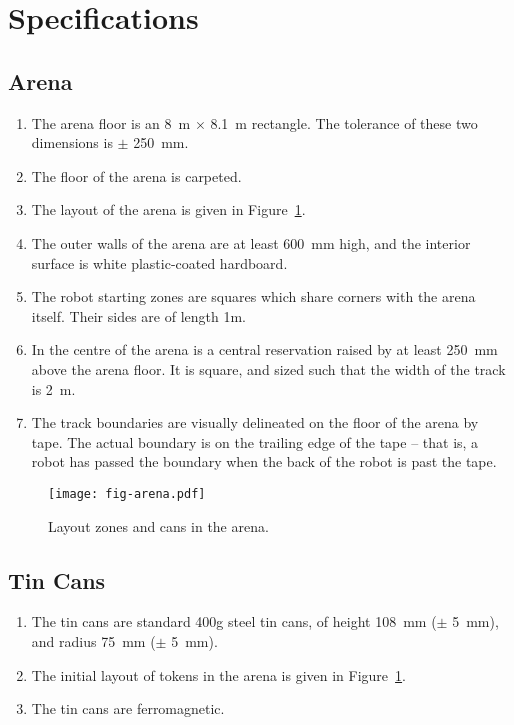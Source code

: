 \section{Specifications}
\label{sec:specs}

\subsection{Arena}
\label{spec:arena}

\begin{enumerate}
  \item The arena floor is an \SI{8}{m} $\times$ \SI{8.1}{m} rectangle. The
        tolerance of these two dimensions is $\pm$ \SI{250}{mm}.
  \item The floor of the arena is carpeted.
  \item The layout of the arena is given in Figure~\ref{fig:arena}.
  \item The outer walls of the arena are at least \SI{600}{mm} high, and the
        interior surface is white plastic-coated hardboard.
  \item The robot starting zones are squares which share corners with the arena
        itself. Their sides are of length \si{1}{m}.
  \item In the centre of the arena is a central reservation raised by
        at least \SI{250}{mm} above the arena floor. It is square, and
        sized such that the width of the track is \SI{2}{m}.
  \item The track boundaries are visually delineated on the floor of the arena
        by tape. The actual boundary is on the trailing edge of the tape --
        that is, a robot has passed the boundary when the back of the robot
        is past the tape.
\end{enumerate}

\begin{figure}
  \texttt{[image: fig-arena.pdf]}
  \caption{Layout zones and cans in the arena.}
  \label{fig:arena}
\end{figure}

\subsection{Tin Cans}
\label{spec:cans}

\begin{enumerate}
  \item The tin cans are standard 400g steel tin cans, of height \SI{108}{mm}
        ($\pm$ \SI{5}{mm}), and radius \SI{75}{mm} ($\pm$ \SI{5}{mm}).
  \item The initial layout of tokens in the arena is given in
        Figure~\ref{fig:arena}.
  \item The tin cans are ferromagnetic.
\end{enumerate}

